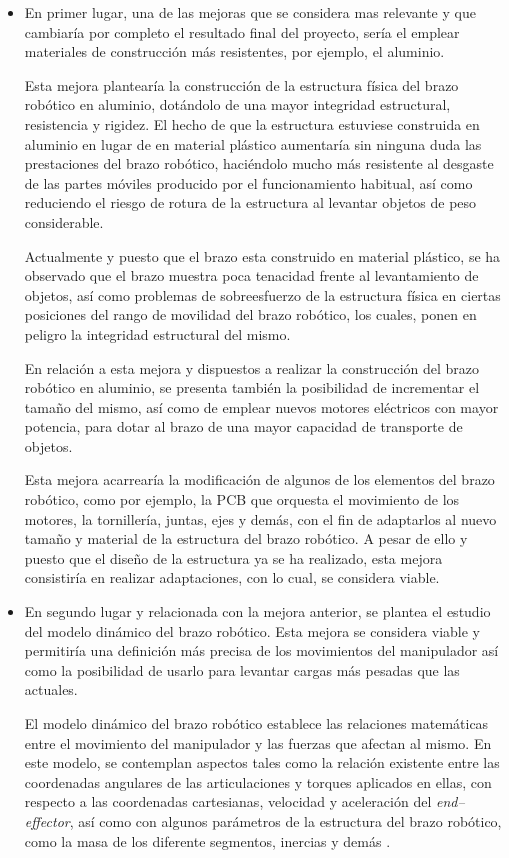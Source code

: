 \begin{itemize}
    \item En primer lugar, una de las mejoras que se considera mas relevante y que cambiaría por completo el resultado final del proyecto, sería el emplear materiales de construcción más resistentes, por ejemplo, el aluminio.
    
    Esta mejora plantearía la construcción de la estructura física del brazo robótico en aluminio, dotándolo de una mayor integridad estructural, resistencia y rigidez. El hecho de que la estructura estuviese construida en aluminio en lugar de en material plástico aumentaría sin ninguna duda las prestaciones del brazo robótico, haciéndolo mucho más resistente al desgaste de las partes móviles producido por el funcionamiento habitual, así como reduciendo el riesgo de rotura de la estructura al levantar objetos de peso considerable.
    
    Actualmente y puesto que el brazo esta construido en material plástico, se ha observado que el brazo muestra poca tenacidad frente al levantamiento de objetos, así como problemas de sobreesfuerzo de la estructura física en ciertas posiciones del rango de movilidad del brazo robótico, los cuales, ponen en peligro la integridad estructural del mismo.
    
    En relación a esta mejora y dispuestos a realizar la construcción del brazo robótico en aluminio, se presenta también la posibilidad de incrementar el tamaño del mismo, así como de emplear nuevos motores eléctricos con mayor potencia, para dotar al brazo de una mayor capacidad de transporte de objetos.
    
    Esta mejora acarrearía la modificación de algunos de los elementos del brazo robótico, como por ejemplo, la PCB que orquesta el movimiento de los motores, la tornillería, juntas, ejes y demás, con el fin de adaptarlos al nuevo tamaño y material de la estructura del brazo robótico. A pesar de ello y puesto que el diseño de la estructura ya se ha realizado, esta mejora consistiría en realizar adaptaciones, con lo cual, se considera viable.
    
    \item En segundo lugar y relacionada con la mejora anterior, se plantea el estudio del modelo dinámico del brazo robótico. Esta mejora se considera viable y permitiría una definición más precisa de los movimientos del manipulador así como la posibilidad de usarlo para levantar cargas más pesadas que las actuales.
    
    El modelo dinámico del brazo robótico establece las relaciones matemáticas entre el movimiento del manipulador y las fuerzas que afectan al mismo. En este modelo, se contemplan aspectos tales como la relación existente entre las coordenadas angulares de las articulaciones y torques aplicados en ellas, con respecto a las coordenadas cartesianas, velocidad y aceleración del \textit{end--effector}, así como con algunos parámetros de la estructura del brazo robótico, como la masa de los diferente segmentos, inercias y demás \cite{LibroPracticasRobotica}.
    

\end{itemize}
